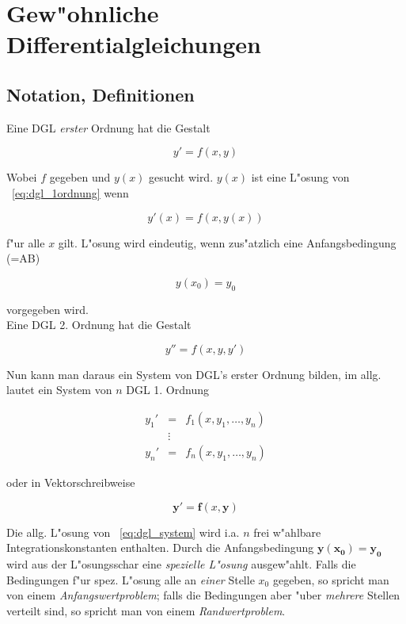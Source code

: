 \documentclass[german, 10pt, a4paper, twocolumn]{scrartcl}
\theoremstyle{definition}
\begin{document}
\section{Gew"ohnliche Differentialgleichungen}

\subsection{Notation, Definitionen}

Eine DGL \textit{erster} Ordnung hat die Gestalt

\begin{equation}
	y' = f(x,y)
	\label{eq:dgl_1ordnung}
\end{equation}

Wobei $f$ gegeben und $y(x)$ gesucht wird. $y(x)$ ist eine L"osung von ~\ref{eq:dgl_1ordnung} wenn 

\begin{displaymath}
	y'(x) = f(x,y(x))
\end{displaymath}

f"ur alle $x$ gilt. L"osung wird eindeutig, wenn zus"atzlich eine Anfangsbedingung (=AB)

\begin{displaymath}
	y(x_0) = y_0
\end{displaymath}

vorgegeben wird.\\

Eine DGL 2. Ordnung hat die Gestalt

\begin{displaymath}
	y'' = f(x,y,y')
\end{displaymath}

Nun kann man daraus ein System von DGL's erster Ordnung bilden, im allg. lautet ein System von $n$ DGL 1. Ordnung

\begin{eqnarray*}
	y_1'&	= &	f_1(x,y_1,\ldots, y_n)\\
	&	\vdots\\
	y_n' &	= &	f_n(x,y_1,\ldots, y_n)
\end{eqnarray*}

oder in Vektorschreibweise

\begin{equation}
	\mathbf{y}' = \mathbf{f}(x,\mathbf{y})
	\label{eq:dgl_system}
\end{equation}

Die allg. L"osung von ~\ref{eq:dgl_system} wird i.a. $n$ frei w"ahlbare Integrationskonstanten enthalten. Durch die Anfangsbedingung $\mathbf{y}(\mathbf{x_0}) = \mathbf{y_0}$ wird aus der L"osungsschar eine \textit{spezielle L"osung} ausgew"ahlt. Falls die Bedingungen f"ur spez. L"osung alle an \textit{einer} Stelle $x_0$ gegeben, so spricht man von einem \textit{Anfangswertproblem}; falls die Bedingungen aber "uber \textit{mehrere} Stellen verteilt sind, so spricht man von einem \textit{Randwertproblem}.
\end{document}
